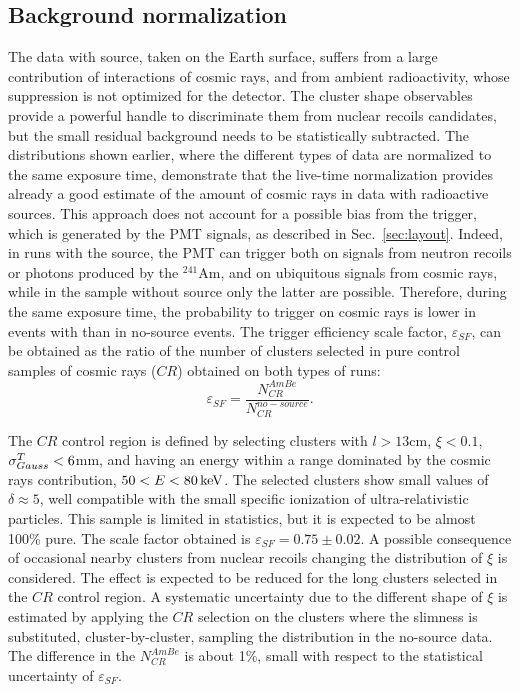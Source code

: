 \subsection{Background normalization}
\label{sec:background}
The data with \ambe source, taken on the Earth surface, suffers from a
large contribution of interactions of cosmic rays, and from ambient
radioactivity, whose suppression is not optimized for the \lemon
detector. The cluster shape observables provide a powerful handle to
discriminate them from nuclear recoils candidates, but the small
residual background needs to be statistically subtracted. The
distributions shown earlier, where the different types of data are
normalized to the same exposure time, demonstrate that the live-time
normalization provides already a good estimate of the amount of cosmic
rays in data with radioactive sources. This approach does not account
for a possible bias from the trigger, which is generated by the PMT
signals, as described in Sec.~\ref{sec:layout}. Indeed, in runs with
the \ambe source, the PMT can trigger both on signals from neutron
recoils or photons produced by the $^{241}$Am, and on ubiquitous
signals from cosmic rays, while in the sample without source only the
latter are possible.  Therefore, during the same exposure time,
the probability to trigger on cosmic rays is lower in events
with \ambe than in no-source events. The trigger efficiency scale
factor, $\varepsilon_{SF}$, can be obtained as the ratio of the number
of clusters selected in pure control samples of cosmic rays ($CR$)
obtained on both types of runs:
\begin{equation}
\label{eq:sfeff}
\varepsilon_{SF} = \frac{N^{AmBe}_{CR}}{N^{no-source}_{CR}}.
\end{equation}

The $CR$ control region is defined by selecting clusters with
$l>13$\unit{cm}, $\xi<0.1$, $\sigma^T_{Gauss}<6$\unit{mm}, and having an
energy within a range dominated by the cosmic rays contribution,
$50<E<80\,\textrm{ke\hspace{-.08em}V}$. The selected clusters show small values of
$\delta\approx5$, well compatible with the small specific ionization
of ultra-relativistic particles.  This sample is limited in
statistics, but it is expected to be almost 100\% pure. The scale
factor obtained is $\varepsilon_{SF}=0.75\pm0.02$.  A possible
consequence of occasional nearby clusters from nuclear recoils
changing the distribution of $\xi$ is considered. The effect is
expected to be reduced for the long clusters selected in the $CR$
control region. A systematic uncertainty due to the different shape of
$\xi$ is estimated by applying the $CR$ selection on the \ambe
clusters where the slimness is substituted, cluster-by-cluster,
sampling the distribution in the no-source data. The difference in the
$N^{AmBe}_{CR}$ is about 1\%, small with respect to the statistical
uncertainty of $\varepsilon_{SF}$.

